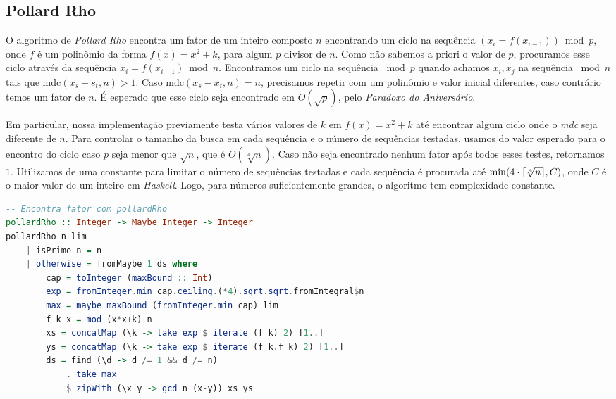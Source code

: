 \documentclass{article}
\DeclarePairedDelimiter{\ceil}{\lceil}{\rceil}
\begin{document}
\subsection{Pollard Rho}
\label{pollardRho}

O algoritmo de \textit{Pollard Rho} encontra um fator de um inteiro composto $n$ encontrando um ciclo na sequência $(x_i = f(x_{i-1})) \bmod p$, onde $f$ é um polinômio da forma $f(x) = x^2 + k$, para algum $p$ divisor de $n$.
Como não sabemos a priori o valor de $p$, procuramos esse ciclo através da sequência $x_i = f(x_{i-1}) \bmod n$.
Encontramos um ciclo na sequência $\bmod p$ quando achamos $x_i, x_j$ na sequência $\bmod n$ tais que $\text{mdc}(x_s - s_t, n) > 1$. Caso $\text{mdc}(x_s - x_t, n) = n$, precisamos repetir com um polinômio e valor inicial diferentes, caso contrário temos um fator de $n$. É esperado que esse ciclo seja encontrado em $O(\sqrt{p})$, pelo \textit{Paradoxo do Aniversário}.

Em particular, nossa implementação previamente testa vários valores de $k$ em $f(x) = x^2+ k$ até encontrar algum ciclo onde o \textit{mdc} seja diferente de $n$. Para controlar o tamanho da busca em cada sequência e o número de sequências testadas, usamos do valor esperado para o encontro do ciclo caso $p$ seja menor que $\sqrt{n}$, que é $O(\sqrt[4]{n})$. Caso não seja encontrado nenhum fator após todos esses testes, retornamos $1$. Utilizamos de uma constante para limitar o número de sequências testadas e cada sequência é procurada até $\min (4 \cdot \ceil{\sqrt[4]{n}}, C)$, onde $C$ é o maior valor de um inteiro em \textit{Haskell}. Logo, para números suficientemente grandes, o algoritmo tem complexidade constante.

\noindent\hspace{0.03\linewidth}
\begin{minipage}{0.9\linewidth}
\begin{lstlisting}[language=haskell,caption=Pollard Rho]
-- Encontra fator com pollardRho
pollardRho :: Integer -> Maybe Integer -> Integer
pollardRho n lim
    | isPrime n = n
    | otherwise = fromMaybe 1 ds where
        cap = toInteger (maxBound :: Int)
        exp = fromInteger.min cap.ceiling.(*4).sqrt.sqrt.fromIntegral$n
        max = maybe maxBound (fromInteger.min cap) lim
        f k x = mod (x*x+k) n
        xs = concatMap (\k -> take exp $ iterate (f k) 2) [1..]
        ys = concatMap (\k -> take exp $ iterate (f k.f k) 2) [1..]
        ds = find (\d -> d /= 1 && d /= n)
            . take max
            $ zipWith (\x y -> gcd n (x-y)) xs ys
\end{lstlisting}
\end{minipage}
\end{document}
